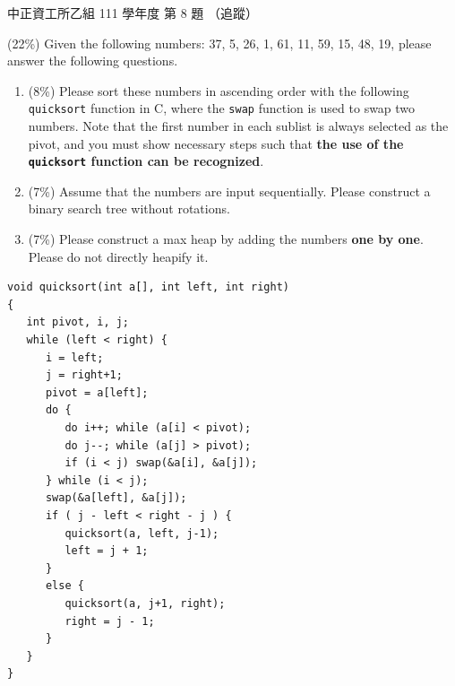 \begin{pastexam}[label={px:ccu-111-csb-02}]{中正資工所乙組 111 學年度 第 8 題}
（追蹤）

(22\%) Given the following numbers: 37, 5, 26, 1, 61, 11, 59, 15, 48, 19, please answer the following
questions.
\begin{enumerate}[label=(\alph*)]
\item (8\%) Please sort these numbers in ascending order with the following \texttt{quicksort} function in
C, where the \texttt{swap} function is used to swap two numbers. Note that the first number in each
sublist is always selected as the pivot, and you must show necessary steps such that \textbf{the use of
the \texttt{quicksort} function can be recognized}.
\item (7\%) Assume that the numbers are input sequentially. Please construct a binary search tree without
rotations.
\item (7\%) Please construct a max heap by adding the numbers \textbf{one by one}. Please do not directly
heapify it.
\end{enumerate}
\begin{verbatim}
void quicksort(int a[], int left, int right)
{
   int pivot, i, j;
   while (left < right) {
      i = left;
      j = right+1;
      pivot = a[left];
      do {
         do i++; while (a[i] < pivot);
         do j--; while (a[j] > pivot);
         if (i < j) swap(&a[i], &a[j]);
      } while (i < j);
      swap(&a[left], &a[j]);
      if ( j - left < right - j ) {
         quicksort(a, left, j-1);
         left = j + 1;
      }
      else {
         quicksort(a, j+1, right);
         right = j - 1;
      }
   }
}
\end{verbatim}
\end{pastexam}

